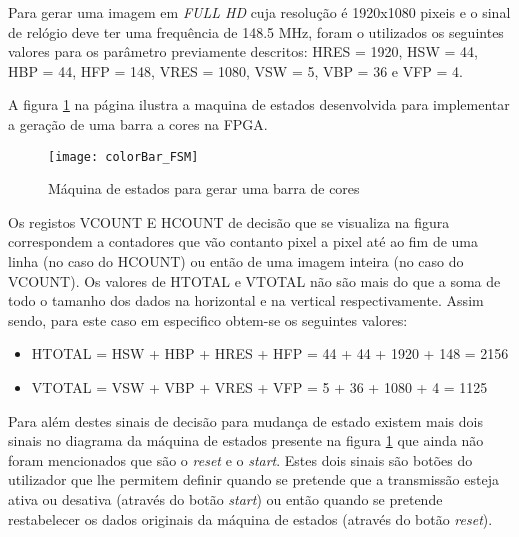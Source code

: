 Para gerar uma imagem em \textit{FULL HD} cuja resolução é 1920x1080 pixeis e o sinal de relógio deve ter uma frequência de 148.5 MHz, foram o utilizados os seguintes valores para os parâmetro previamente descritos: HRES = 1920, HSW = 44, HBP = 44, HFP = 148,  VRES = 1080, VSW = 5, VBP = 36 e VFP = 4.
%

A figura \ref{fig:colorBar_fsm} na página \pageref{fig:colorBar_fsm} ilustra a maquina de estados desenvolvida para implementar a geração de uma barra a cores na FPGA. 

\begin{figure}[h!]
	\begin{center}
		\leavevmode
		\texttt{[image: colorBar\_FSM]}
		\caption{Máquina de estados para gerar uma barra de cores}
		\label{fig:colorBar_fsm}
	\end{center}
\end{figure}

Os registos VCOUNT E HCOUNT de decisão que se visualiza na figura correspondem a contadores que vão contanto pixel a pixel até ao fim de uma linha (no caso do HCOUNT) ou então de uma imagem inteira (no caso do VCOUNT). Os valores de HTOTAL e VTOTAL não são mais do que a soma de todo o tamanho dos dados na horizontal e na vertical respectivamente. Assim sendo, para este caso em especifico obtem-se os seguintes valores:
\begin{itemize}
	\item HTOTAL = HSW + HBP + HRES + HFP = 44 + 44 + 1920 + 148 = 2156
	\item VTOTAL = VSW + VBP + VRES + VFP = 5 + 36 + 1080 + 4 = 1125
\end{itemize}

Para além destes sinais de decisão para mudança de estado existem mais dois sinais no diagrama da máquina de estados presente na figura \ref{fig:colorBar_fsm} que ainda não foram mencionados que são o \textit{reset} e o \textit{start}. Estes dois sinais são botões do utilizador que lhe permitem definir quando se pretende que a transmissão esteja ativa ou desativa (através do botão \textit{start}) ou então quando se pretende restabelecer os dados originais da máquina de estados (através do botão \textit{reset}). 


